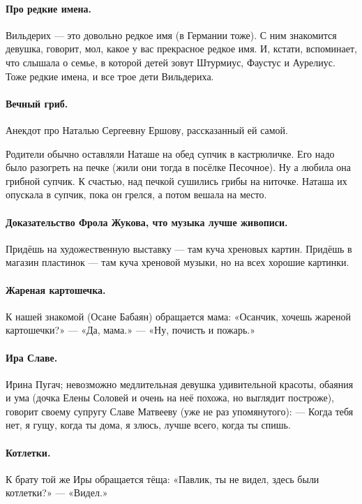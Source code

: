 \documentclass{book}
\begin{document}
\paragraph{Про редкие имена.}
Вильдерих --- это довольно редкое имя (в Германии тоже).
С ним знакомится девушка, говорит, мол, какое у вас прекрасное редкое имя.
И, кстати, вспоминает, что слышала о семье, в которой детей зовут Штурмиус, Фаустус и Аурелиус.
Тоже редкие имена, и все трое дети Вильдериха.

\paragraph{Вечный гриб.}
Анекдот про Наталью Сергеевну Ершову, рассказанный ей самой.

Родители обычно оставляли Наташе на обед супчик в кастрюличке.
Его надо было разогреть на печке (жили они тогда в посёлке Песочное).
Ну а любила она грибной супчик.
К счастью, над печкой сушились грибы на ниточке.
Наташа их опускала в супчик, пока он грелся, а потом вешала на место.

\paragraph{Доказательство Фрола Жукова, что музыка лучше живописи.}
Придёшь на художественную выставку --- там куча хреновых картин.
Придёшь в магазин пластинок --- там куча хреновой музыки, но на всех хорошие картинки. 

\paragraph{Жареная картошечка.}
К нашей знакомой (Осане Бабаян) обращается мама:
«Осанчик, хочешь жареной картошечки?» --- «Да, мама.» --- «Ну, почисть и пожарь.»

\paragraph{Ира Славе.}
Ирина Пугач; невозможно медлительная девушка удивительной красоты, обаяния и ума (дочка Елены Соловей и очень на неё похожа, но выглядит построже), говорит своему супругу Славе Матвееву (уже не раз упомянутого):
--- Когда тебя нет, я гущу, когда ты дома, я злюсь, лучше всего, когда ты спишь.

\paragraph{Котлетки.}
К брату той же Иры обращается тёща:
«Павлик, ты не видел, здесь были котлетки?» --- «Видел.»
\end{document}
